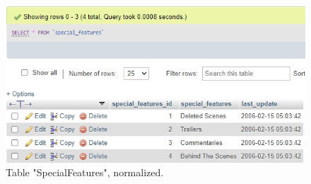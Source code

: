 \documentclass{article}
\begin{document}
		\begin{figure}[H]
			\includegraphics[width=\textwidth]{table_specialfeatures_norm}
			\caption{Table "Special\textunderscore Features", normalized.}
		\end{figure}
\end{document}
